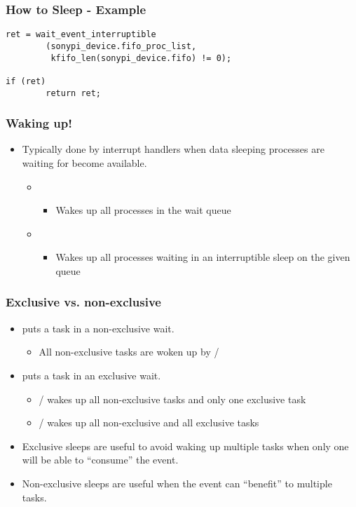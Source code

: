 \begin{frame}[fragile]
\frametitle{How to Sleep - Example}
\begin{verbatim}
ret = wait_event_interruptible
        (sonypi_device.fifo_proc_list,
         kfifo_len(sonypi_device.fifo) != 0);

if (ret)
        return ret;
\end{verbatim}
\end{frame}

\begin{frame}
  \frametitle{Waking up!}
  \begin{itemize}
  \item Typically done by interrupt handlers when data sleeping
    processes are waiting for become available.
    \begin{itemize}
    \item {}
      \begin{itemize}
      \item Wakes up all processes in the wait queue
      \end{itemize}
    \item {}
      \begin{itemize}
      \item Wakes up all processes waiting in an interruptible sleep
        on the given queue
      \end{itemize}
    \end{itemize}
  \end{itemize}
\end{frame}

\begin{frame}
  \frametitle{Exclusive vs. non-exclusive}
  \begin{itemize}
  \item {} puts a task in a
    non-exclusive wait.
    \begin{itemize}
    \item All non-exclusive tasks are woken up by  /
    \end{itemize}
  \item {} puts a task in an
    exclusive wait.
    \begin{itemize}
    \item {} /  wakes up
      all non-exclusive tasks and only one exclusive task
    \item {} / 
      wakes up all non-exclusive and all exclusive tasks
    \end{itemize}
  \item Exclusive sleeps are useful to avoid waking up multiple tasks
    when only one will be able to ``consume'' the event.
  \item Non-exclusive sleeps are useful when the event can ``benefit''
    to multiple tasks.
  \end{itemize}
\end{frame}


